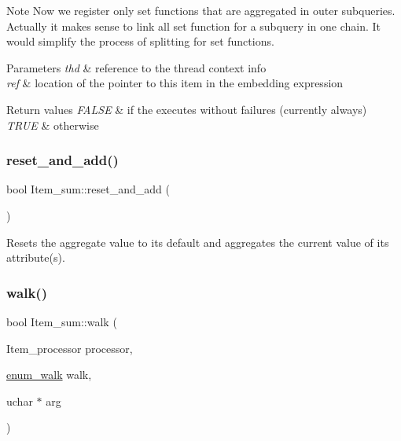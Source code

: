 \begin{DoxyNote}{Note}
Now we \textquotesingle{}register\textquotesingle{} only set functions that are aggregated in outer subqueries. Actually it makes sense to link all set function for a subquery in one chain. It would simplify the process of \textquotesingle{}splitting\textquotesingle{} for set functions.
\end{DoxyNote}

\begin{DoxyParams}{Parameters}
{\em thd} & reference to the thread context info \\
\hline
{\em ref} & location of the pointer to this item in the embedding expression\\
\hline
\end{DoxyParams}

\begin{DoxyRetVals}{Return values}
{\em F\+A\+L\+SE} & if the executes without failures (currently always) \\
\hline
{\em T\+R\+UE} & otherwise \\
\hline
\end{DoxyRetVals}
\mbox{\label{classItem__sum_a5d29c1ad81ae5e0193775cb360f4a74a}} 
\subsubsection{\texorpdfstring{reset\+\_\+and\+\_\+add()}{reset\_and\_add()}}
{\footnotesize\ttfamily bool Item\+\_\+sum\+::reset\+\_\+and\+\_\+add (\begin{DoxyParamCaption}{ }\end{DoxyParamCaption})\hspace{0.3cm}{\ttfamily [inline]}}

Resets the aggregate value to its default and aggregates the current value of its attribute(s). \mbox{\label{classItem__sum_ae323b192d183b3f85bbee92c43685310}} 
\subsubsection{\texorpdfstring{walk()}{walk()}}
{\footnotesize\ttfamily bool Item\+\_\+sum\+::walk (\begin{DoxyParamCaption}\item[{Item\+\_\+processor}]{processor,  }\item[{\mbox{\hyperlink{classItem_a4e68f315ba2a26543339e9f0efed3695}{enum\+\_\+walk}}}]{walk,  }\item[{uchar $\ast$}]{arg }\end{DoxyParamCaption})\hspace{0.3cm}{\ttfamily [virtual]}}

